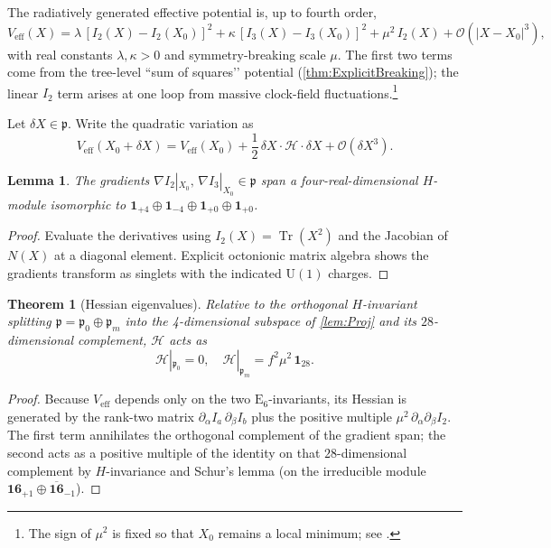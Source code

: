 \documentclass[pdflatex,sn-mathphys-num]{sn-jnl}
\theoremstyle{thmstyleone}
\newtheorem{theorem}{Theorem}
\newtheorem{lemma}[lemma]{Lemma}
\theoremstyle{thmstyletwo}%
\theoremstyle{thmstylethree}%
\newcommand{\U}[1]{\mathrm{U(#1)}}
\newcommand{\E}[1]{\mathrm{E_{#1}}}
\newcommand{\UOne}{\U{1}}
\newcommand{\ESix}{\E{6}}
\newcommand{\Tr}{\operatorname{Tr}}
\begin{document}
\begin{appendices}
The radiatively generated effective potential is, up to fourth order,
\begin{equation}\label{eq:Veff}
  V_{\text{eff}}(X)
  =
  \lambda\,[I_{2}(X)-I_{2}(X_{0})]^{2}
  +\kappa\,[I_{3}(X)-I_{3}(X_{0})]^{2}
  +\mu^{2}\,I_{2}(X)+\mathcal O(|X-X_{0}|^{3}),
\end{equation}
with real constants \(\lambda,\kappa>0\) and symmetry-breaking scale
\(\mu\).  The first two terms come from the tree-level
“sum of squares’’ potential (\autoref{thm:ExplicitBreaking});
the linear \(I_{2}\) term arises at one loop from massive
clock-field fluctuations.\footnote{%
  The sign of \(\mu^{2}\) is fixed so that $X_{0}$ remains a local
  minimum; see \cite{ColemanWeinberg:1973}.}

Let \(\delta X\in\mathfrak p\).
Write the quadratic variation as
\[V_{\text{eff}}(X_{0}+\delta X)=
  V_{\text{eff}}(X_{0})+\frac12\,\delta X\cdot\mathcal H\cdot\delta X
  +\mathcal O(\delta X^{3}).\]

\begin{lemma}\label{lem:Proj}
The gradients
\(
  \nabla I_{2}|_{X_{0}},\,
  \nabla I_{3}|_{X_{0}}\in\mathfrak p
\)
span a four-real-dimensional $H$-module isomorphic to
\(\mathbf{1}_{+4}\oplus\mathbf{1}_{-4}\oplus\mathbf{1}_{+0}\oplus\mathbf{1}_{+0}\).
\end{lemma}

\begin{proof}
Evaluate the derivatives using
\(I_{2}(X)=\Tr(X^{2})\) and the Jacobian of
\(N(X)\) at a diagonal element.  Explicit octonionic matrix algebra
shows the gradients transform as singlets with the indicated $\UOne$
charges.
\end{proof}

\begin{theorem}[Hessian eigenvalues]\label{thm:Hessian}
Relative to the orthogonal $H$-invariant splitting
\(\mathfrak p=\mathfrak p_{0}\oplus\mathfrak p_{m}\)
into the 4-dimensional subspace of \autoref{lem:Proj}
and its $28$-dimensional complement,
\(\mathcal H\) acts as
\[
  \mathcal H|_{\mathfrak p_{0}}=0,
  \quad
  \mathcal H|_{\mathfrak p_{m}}=f^{2}\mu^{2}\,\mathbf 1_{28}.
\]
\end{theorem}

\begin{proof}
Because \(V_{\text{eff}}\) depends only on the two
$\ESix$-invariants, its Hessian is generated by the
rank-two matrix
\(
  \partial_\alpha I_{a}\,\partial_\beta I_{b}
\)
plus the positive multiple
\(\mu^{2}\,\partial_{\alpha}\partial_{\beta}I_{2}\).
The first term annihilates the orthogonal complement of the gradient
span; the second acts as a positive multiple of the identity on that
$28$-dimensional complement by $H$-invariance and Schur’s lemma
(on the irreducible module \(\mathbf{16}_{+1}\oplus\overline{\mathbf{16}}_{-1}\)).
\end{proof}


\end{appendices}
\end{document}
